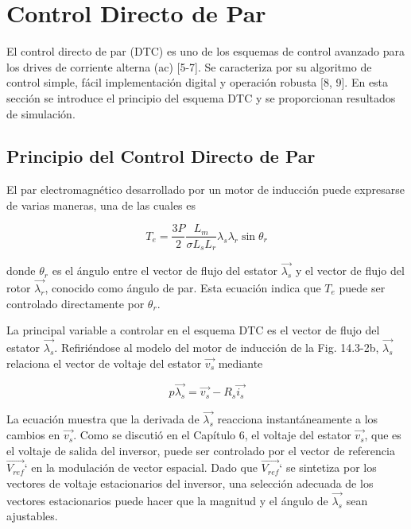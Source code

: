 \documentclass[letterpaper,12pt]{article}
\begin{document}
\section{Control Directo de Par}
El control directo de par (DTC) es uno de los esquemas de control avanzado para los drives de corriente alterna (ac) [5-7]. Se caracteriza por su algoritmo de control simple, fácil implementación digital y operación robusta [8, 9]. En esta sección se introduce el principio del esquema DTC y se proporcionan resultados de simulación.

\subsection{Principio del Control Directo de Par}
El par electromagnético desarrollado por un motor de inducción puede expresarse de varias maneras, una de las cuales es

\begin{equation}
T_e = \frac{3P}{2} \frac{L_m}{\sigma L_s L_r} \lambda_s \lambda_r \sin \theta_r \tag{14.8-1}
\end{equation}

donde $\theta_r$ es el ángulo entre el vector de flujo del estator $\vec{\lambda_s}$ y el vector de flujo del rotor $\vec{\lambda_r}$, conocido como ángulo de par. Esta ecuación indica que $T_e$ puede ser controlado directamente por $\theta_r$.

La principal variable a controlar en el esquema DTC es el vector de flujo del estator $\vec{\lambda_s}$. Refiriéndose al modelo del motor de inducción de la Fig. 14.3-2b, $\vec{\lambda_s}$ relaciona el vector de voltaje del estator $\vec{v_s}$ mediante

\begin{equation}
p \vec{\lambda_s} = \vec{v_s} - R_s \vec{i_s} \tag{14.8-2}
\end{equation}

La ecuación muestra que la derivada de $\vec{\lambda_s}$ reacciona instantáneamente a los cambios en $\vec{v_s}$. Como se discutió en el Capítulo 6, el voltaje del estator $\vec{v_s}$, que es el voltaje de salida del inversor, puede ser controlado por el vector de referencia $\vec{V_{ref}}$` en la modulación de vector espacial. Dado que $\vec{V_{ref}}$` se sintetiza por los vectores de voltaje estacionarios del inversor, una selección adecuada de los vectores estacionarios puede hacer que la magnitud y el ángulo de $\vec{\lambda_s}$ sean ajustables.
\end{document}
